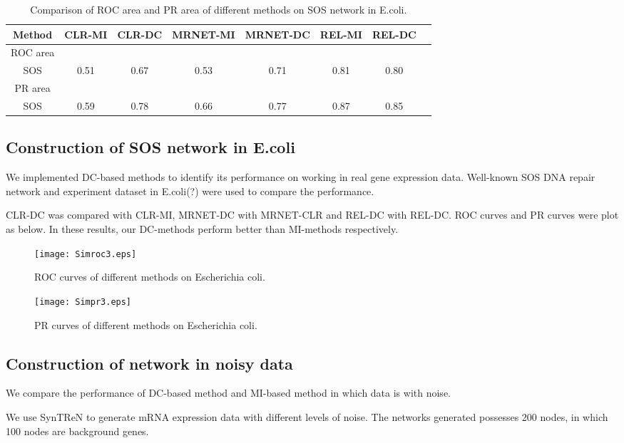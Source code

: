 \documentclass{bioinfo}
\begin{document}
\begin{table}[0.5\textwidth] \tiny
\centering \caption{Comparison of ROC area and PR area of different methods on SOS network in E.coli.}\label{roc-pr}
\begin{tabular}{cccccccc}
 \hline
 Method & CLR-MI & CLR-DC & MRNET-MI & MRNET-DC & REL-MI & REL-DC \\
 \hline
  ROC area\\
  SOS     & 0.51 & 0.67 & 0.53 & 0.71 & 0.81 & 0.80 \\
 PR area\\
  SOS   & 0.59 &0.78 & 0.66 & 0.77 & 0.87 & 0.85 \\
  \hline
\end{tabular}
\end{table}

\subsection{Construction of SOS network in E.coli}
We implemented DC-based methods to identify its performance on
working in real gene expression data. Well-known SOS DNA repair
network and experiment dataset in E.coli(?) were used to compare the
performance.

CLR-DC was compared with CLR-MI, MRNET-DC with MRNET-CLR and REL-DC
with REL-DC. ROC curves and PR curves were plot as below. In these
results, our DC-methods perform better than MI-methods respectively. 

\begin{figure}[!h]
  \texttt{[image: Simroc3.eps]}
  \caption{ROC curves of different methods on Escherichia coli.}\label{roc-sos}
\end{figure}

\begin{figure}[!h]
  \texttt{[image: Simpr3.eps]}
  \caption{PR curves of different methods on Escherichia coli.}\label{pr-sos}
\end{figure}

\subsection{Construction of network in noisy data}
We compare the performance of DC-based method and MI-based method in
which data is with noise.

  We use SynTReN to generate mRNA expression data with different
levels of noise. The networks generated possesses 200 nodes, in
which 100 nodes are background genes.\\
\end{document}

